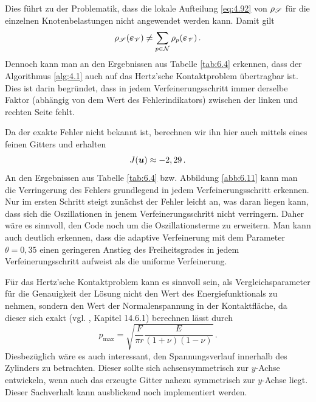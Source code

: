 \begin{bsp}
Dies führt zu der Problematik, dass die lokale Aufteilung \eqref{eq:4.92} von $\rho_{\mathscr S}$ für die einzelnen Knotenbelastungen nicht angewendet werden kann. Damit gilt
\[
	\rho_{\mathscr S} (\boldsymbol {\varepsilon}_{\mathscr V}) \not = \sum_{p\in \mathcal N} \rho_p (\boldsymbol {\varepsilon}_{\mathscr V}) \, .
\]
Dennoch kann man an den Ergebnissen aus Tabelle \ref{tab:6.4} erkennen, dass der Algorithmus \ref{alg:4.1} auch auf das Hertz'sche Kontaktproblem übertragbar ist. Dies ist darin begründet, dass in jedem Verfeinerungsschritt immer derselbe Faktor (abhängig von dem Wert des Fehlerindikators) zwischen der linken und rechten Seite fehlt.

Da der exakte Fehler nicht bekannt ist, berechnen wir ihn hier auch mittels eines feinen Gitters und erhalten
\[
	J(\boldsymbol u) \approx -2,29 \, .
\]
An den Ergebnissen aus Tabelle \ref{tab:6.4} bzw. Abbildung \ref{abb:6.11} kann man die Verringerung des Fehlers grundlegend in jedem Verfeinerungsschritt erkennen. Nur im ersten Schritt steigt zunächst der Fehler leicht an, was daran liegen kann, dass sich die Oszillationen in jenem Verfeinerungsschritt nicht verringern. Daher wäre es sinnvoll, den Code noch um die Oszillationsterme zu erweitern. Man kann auch deutlich erkennen, dass die adaptive Verfeinerung mit dem Parameter $\theta = 0,35$ einen geringeren Anstieg des Freiheitsgrades in jedem Verfeinerungsschritt aufweist als die uniforme Verfeinerung.

Für das Hertz'sche Kontaktproblem kann es sinnvoll sein, als Vergleichsparameter für die Genauigkeit der Lösung nicht den Wert des Energiefunktionals zu nehmen, sondern den Wert der Normalenspannung in der Kontaktfläche, da dieser sich exakt  (vgl. \cite{WriggersContact}, Kapitel 14.6.1) berechnen lässt durch
\[
	p_{\text{max}} = \sqrt{\frac F{\pi r} \frac E{(1+\nu)(1-\nu)}} \, .
\]
Diesbezüglich wäre es auch interessant, den Spannungsverlauf innerhalb des Zylinders zu betrachten. Dieser sollte sich achsensymmetrisch zur $y$-Achse entwickeln, wenn auch das erzeugte Gitter nahezu symmetrisch zur $y$-Achse liegt. Dieser Sachverhalt kann ausblickend noch implementiert werden.


\end{bsp}
